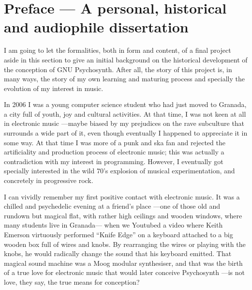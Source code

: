 
\chapter*{Preface --- A personal, historical and audiophile
  dissertation}



I am going to let the formalities, both in form and content, of a
final project aside in this section to give an initial background on
the historical development of the conception of GNU Psychosynth. After
all, the story of this project is, in many ways, the story of my own
learning and maturing process and specially the evolution of my
interest in music.

In 2006 I was a young computer science student who had just moved to
Granada, a city full of youth, joy and cultural activities. At that
time, I was not keen at all in electronic music ---maybe biased by my
prejudices on the rave subculture that surrounds a wide part of it,
even though eventually I happened to appreciate it in some way. At
that time I was more of a punk and ska fan and rejected the
artificiality and production process of electronic music; this was
actually a contradiction with my interest in programming. However, I
eventually got specially interested in the wild 70's explosion of
musical experimentation, and concretely in progressive rock.

I can vividly remember my first positive contact with electronic
music. It was a chilled and psychedelic evening at a friend's place
---one of those old and rundown but magical flat, with rather high
ceilings and wooden windows, where many students live in Granada---
when we Youtubed a video where Keith Emerson virtuously performed
``Knife Edge'' on a keyboard attached to a big wooden box full of
wires and knobs. By rearranging the wires or playing with the knobs,
he would radically change the sound that his keyboard
emitted. That magical sound machine was a Moog modular synthesiser,
and that was the birth of a true love for electronic music that would
later conceive Psychosynth ---is not love, they say, the true means
for conception?

